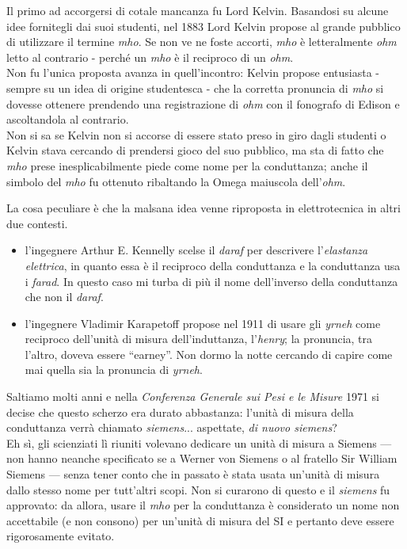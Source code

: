 \begin{digressionwt}
	Il primo ad accorgersi di cotale mancanza fu Lord Kelvin. Basandosi su alcune idee fornitegli dai suoi studenti,  nel 1883 Lord Kelvin propose al grande pubblico di utilizzare il termine \textit{mho}.	Se non ve ne foste accorti, \textit{mho} è letteralmente \textit{ohm} letto al contrario - perché un \textit{mho} è il reciproco di un \textit{ohm}.\\
	Non fu l'unica proposta avanza in quell'incontro: Kelvin propose entusiasta - sempre su un idea di origine studentesca - che la corretta pronuncia di \textit{mho} si dovesse ottenere prendendo una registrazione di \textit{ohm} con il fonografo di Edison e ascoltandola al contrario.\\
	Non si sa se Kelvin non si accorse di essere stato preso in giro dagli studenti o Kelvin stava cercando di prendersi gioco del suo pubblico, ma sta di fatto che \textit{mho} prese inesplicabilmente piede come nome per la conduttanza; anche il simbolo del \textit{mho} fu ottenuto ribaltando la Omega maiuscola dell'\textit{ohm}.

	La cosa peculiare è che la malsana idea venne riproposta in elettrotecnica in altri due contesti.
	\begin{itemize}
		\item l'ingegnere Arthur E. Kennelly scelse il \textit{daraf} per descrivere l'\textit{elastanza elettrica}, in quanto essa è il reciproco della conduttanza e la conduttanza usa i \textit{farad}. In questo caso mi turba di più il nome dell'inverso della conduttanza che non il \textit{daraf}.
		\item l'ingegnere Vladimir Karapetoff propose nel 1911 di usare gli \textit{yrneh} come reciproco dell'unità di misura dell'induttanza, l'\textit{henry}; la pronuncia, tra l'altro, doveva essere ``earney''. Non dormo la notte cercando di capire come mai quella sia la pronuncia di \textit{yrneh}.
	\end{itemize}
	Saltiamo molti anni e nella \textit{Conferenza Generale sui Pesi e le Misure} 1971 si decise che questo scherzo era durato abbastanza: l'unità di misura della conduttanza verrà chiamato \textit{siemens}... aspettate, \textit{di nuovo siemens}?\\
	Eh sì, gli scienziati lì riuniti volevano dedicare un unità di misura a Siemens --- non hanno neanche specificato se a Werner von Siemens o al fratello Sir William Siemens --- senza tener conto che in passato è stata usata un'unità di misura dallo stesso nome per tutt'altri scopi. Non si curarono di questo e il \textit{siemens} fu approvato: da allora, usare il \textit{mho} per la conduttanza è considerato un nome non accettabile (e non consono) per un'unità di misura del SI e pertanto deve essere rigorosamente evitato.
\end{digressionwt} 
